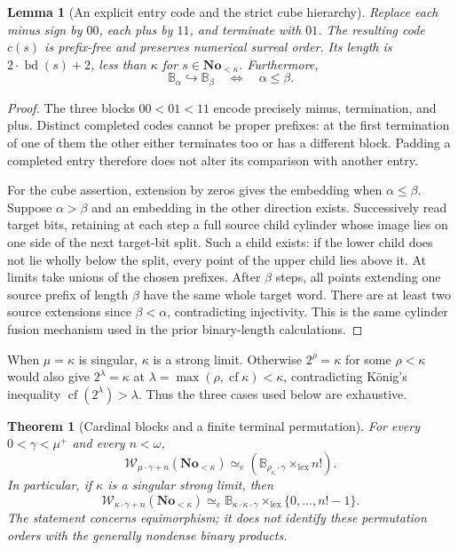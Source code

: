 \documentclass[11pt]{article}
\newtheorem{theorem}{Theorem}[section]
\newtheorem{lemma}[lemma]{Lemma}
\theoremstyle{definition}
\theoremstyle{remark}
\newcommand{\No}{\mathbf{No}}
\newcommand{\WO}{\mathcal W}
\newcommand{\B}{\mathbb B}
\newcommand{\lex}{\mathrm{lex}}
\newcommand{\cf}{\operatorname{cf}}
\newcommand{\bd}{\operatorname{bd}}
\newcommand{\emb}{\hookrightarrow}
\newcommand{\equi}{\mathrel{\simeq_{\!e}}}
\begin{document}
\begin{lemma}[An explicit entry code and the strict cube hierarchy]\label{swo:cb:lem:entrycode}
Replace each minus sign by $00$, each plus by $11$, and terminate with
$01$. The resulting code $c(s)$ is prefix-free and preserves numerical
surreal order. Its length is $2\cdot\bd(s)+2$, less than $\kappa$
for $s\in\No_{<\kappa}$. Furthermore,
\[
 \B_\alpha\emb\B_\beta\quad\Longleftrightarrow\quad\alpha\leq\beta.
\]
\end{lemma}
\begin{proof}
The three blocks $00<01<11$ encode precisely minus, termination, and
plus. Distinct completed codes cannot be proper prefixes: at the first
termination of one of them the other either terminates too or has a
different block. Padding a completed entry therefore does not alter its
comparison with another entry.

For the cube assertion, extension by zeros gives the embedding when
$\alpha\leq\beta$. Suppose $\alpha>\beta$ and an embedding in the other
direction exists. Successively read target bits, retaining at each step
a full source child cylinder whose image lies on one side of the next
target-bit split. Such a child exists: if the lower child does not lie
wholly below the split, every point of the upper child lies above it.
At limits take unions of the chosen prefixes. After $\beta$ steps, all
points extending one source prefix of length $\beta$ have the same whole
target word. There are at least two source extensions since
$\beta<\alpha$, contradicting injectivity. This is the same cylinder
fusion mechanism used in the prior binary-length calculations.
\end{proof}

When $\mu=\kappa$ is singular, $\kappa$ is a strong limit. Otherwise
$2^\rho=\kappa$ for some $\rho<\kappa$ would also give
$2^\lambda=\kappa$ at $\lambda=\max(\rho,\cf\kappa)<\kappa$,
contradicting K\"onig's inequality $\cf(2^\lambda)>\lambda$.
Thus the three cases used below are exhaustive.

\begin{theorem}[Cardinal blocks and a finite terminal permutation]
\label{swo:cb:new:thm:block-types}
For every $0<\gamma<\mu^+$ and every $n<\omega$,
\[
 \boxed{\quad
 \WO_{\mu\cdot\gamma+n}(\No_{<\kappa})
       \equi (\B_{\rho_\kappa\cdot\gamma}\times_{\lex}n!).
 \quad}
\]
In particular, if $\kappa$ is a singular strong limit, then
\[
 \WO_{\kappa\cdot\gamma+n}(\No_{<\kappa})
       \equi
       \B_{\kappa\cdot\kappa\cdot\gamma}
          \times_{\mathrm{lex}}\{0,\ldots,n!-1\}.
\]
The statement concerns equimorphism; it does not identify these
permutation orders with the generally nondense binary products.
\end{theorem}
\end{document}
